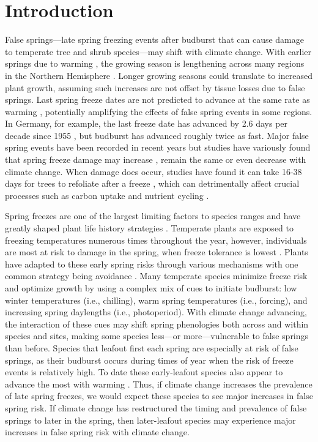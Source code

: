 \documentclass{article}\usepackage[]{graphicx}\usepackage[]{color}
\begin{document}
\section*{Introduction} %
False springs---late spring freezing events after budburst that can cause damage to temperate tree and shrub species---may shift with climate change. With earlier springs due to warming \citep{IPCC2014, Wolkovich2012}, the growing season is lengthening across many regions in the Northern Hemisphere \citep{Chen2005, Kukal2018, Liu2006}. Longer growing seasons could translate to increased plant growth, assuming such increases are not offset by tissue losses due to false springs. Last spring freeze dates are not predicted to advance at the same rate as warming \citep{Inouye2008, Labe2016, Martin2010,Sgubin2018,Wypych2016a}, potentially amplifying the effects of false spring events in some regions. In Germany, for example, the last freeze date has advanced by 2.6 days per decade since 1955 \citep{Zohner2016}, but budburst has advanced roughly twice as fast. Major false spring events have been recorded in recent years but studies have variously found that spring freeze damage may increase \citep{Augspurger2013, Hannenin1991, Labe2016}, remain the same \citep{Scheifinger2003} or even decrease \citep{Kramer1994, Vitra2017} with climate change. When damage does occur, studies have found it can take 16-38 days for trees to refoliate after a freeze \citep{Augspurger2009, Augspurger2013, Gu2008, Menzel2015}, which can detrimentally affect crucial processes such as carbon uptake and nutrient cycling \citep{Hufkens2012, Klosterman2018, Richardson2013}.  

Spring freezes are one of the largest limiting factors to species ranges and have greatly shaped plant life history strategies \citep{Kollas2014}. Temperate plants are exposed to freezing temperatures numerous times throughout the year, however, individuals are most at risk to damage in the spring, when freeze tolerance is lowest \citep{Sakai1987}. Plants have adapted to these early spring risks through various mechanisms with one common strategy being avoidance \citep{Vitasse2014}. Many temperate species minimize freeze risk and optimize growth by using a complex mix of cues to initiate budburst: low winter temperatures (i.e., chilling), warm spring temperatures (i.e., forcing), and increasing spring daylengths (i.e., photoperiod). With climate change advancing, the interaction of these cues may shift spring phenologies both across and within species and sites, making some species less---or more---vulnerable to false springs than before. Species that leafout first each spring are especially at risk of false springs, as their budburst occurs during times of year when the risk of freeze events is relatively high. To date these early-leafout species also appear to advance the most with warming  \citep{Wolkovich2012}. Thus, if climate change increases the prevalence of late spring freezes, we would expect these species to see major increases in false spring risk. If climate change has restructured the timing and prevalence of false springs to later in the spring, then later-leafout species may experience major increases in false spring risk with climate change. 
\end{document}
